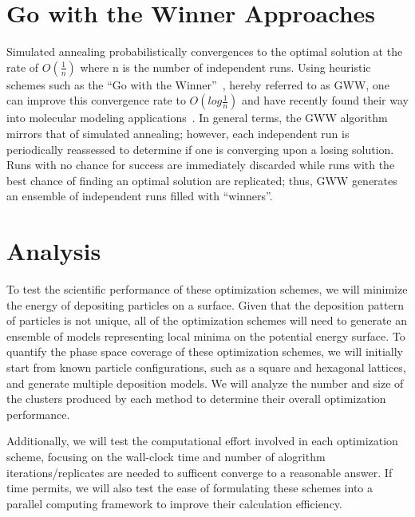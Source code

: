 \documentclass[10pt,twocolumn,notitlepage]{article}
\begin{document}
\section{Go with the Winner Approaches}
Simulated annealing probabilistically convergences to the optimal solution at the rate
 of $O(\frac{1}{n})$ where n is the number of independent runs.  
Using heuristic schemes such as the ``Go with the Winner''~\cite{Aldous1994gwt}, hereby referred to as GWW, 
one can improve this convergence rate to $O(log \frac{1}{n})$ and have recently found their way into molecular modeling applications~\cite{Peinado1997gwt}.  In general terms, the GWW algorithm mirrors that of simulated annealing; however, each independent run is periodically reassessed to determine if one is converging upon a losing solution.  Runs with 
no chance for success are immediately discarded while runs with the best chance of finding an optimal solution
are replicated; thus, GWW generates an ensemble of independent runs filled with  ``winners''.  

\section{Analysis}
To test the scientific performance of these optimization schemes, we will minimize the energy of depositing particles on a surface.  Given that the deposition pattern of particles is not unique, all of the optimization schemes will need to generate an ensemble of models representing local minima on the potential energy surface.  To quantify the phase space coverage of these optimization schemes, we will initially start from known particle configurations, such as a square and hexagonal lattices, and generate multiple deposition models.  We will analyze the number and size of the clusters produced by each method to determine their overall optimization performance.  

Additionally, we will test the computational effort involved in each optimization scheme, focusing on the wall-clock time and number of alogrithm iterations/replicates are needed to sufficent converge to a reasonable answer.  If time permits, we will also test the ease of formulating these schemes into a parallel computing framework to improve their calculation efficiency.



\end{document}
